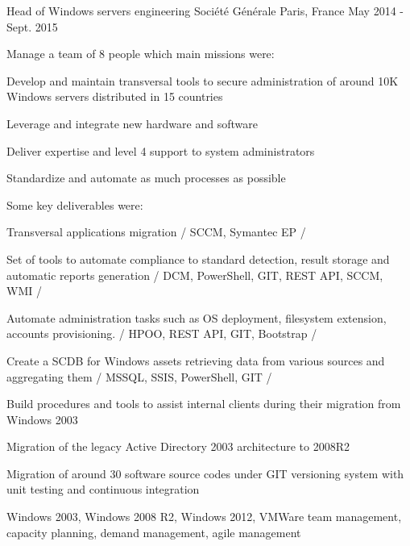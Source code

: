 \begin{cventries}
    \cventry
    {Head of Windows servers engineering} %
    {Société Générale} %
    {Paris, France} %
    {May 2014 - Sept. 2015} %
    { %
        Manage a team of 8 people which main missions were: \hfill\break
        \begin{cvitems}
            \item {Develop and maintain transversal tools to secure administration of around 10K Windows servers distributed in 15 countries}
            \item {Leverage and integrate new hardware and software}
            \item {Deliver expertise and level 4 support to system administrators}
            \item {Standardize and automate as much processes as possible}
        \end{cvitems} \hfill\break
        Some key deliverables were: \hfill\break
        \begin{cvitems}
            \item {Transversal applications migration / SCCM, Symantec EP /}
            \item {Set of tools to automate compliance to standard detection, result storage and automatic reports generation / DCM, PowerShell, GIT, REST API, SCCM, WMI /}
            \item {Automate administration tasks such as OS deployment, filesystem extension, accounts provisioning. / HPOO, REST API, GIT, Bootstrap /}
            \item {Create a SCDB for Windows assets retrieving data from various sources and aggregating them / MSSQL, SSIS, PowerShell, GIT /}
            \item {Build procedures and tools to assist internal clients during their migration from Windows 2003}
            \item {Migration of the legacy Active Directory 2003 architecture to 2008R2}
            \item {Migration of around 30 software source codes under GIT versioning system with unit testing and continuous integration}
        \end{cvitems} \hfill\break
        \begin{cvskills}
             {Windows 2003, Windows 2008 R2, Windows 2012, VMWare}
             {team management, capacity planning, demand management, agile management}
        \end{cvskills}
    }


\end{cventries}
